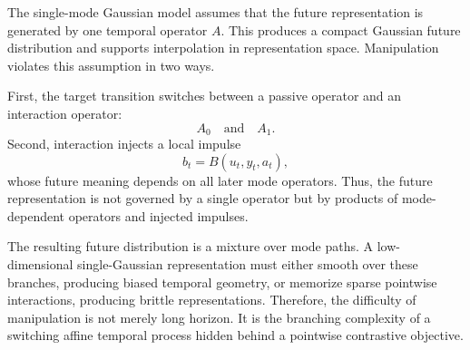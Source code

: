 The single-mode Gaussian model assumes that the future representation is generated by one temporal operator \(A\). This produces a compact Gaussian future distribution and supports interpolation in representation space. Manipulation violates this assumption in two ways.

First, the target transition switches between a passive operator and an interaction operator:
\[
A_0
\quad\text{and}\quad
A_1.
\]
Second, interaction injects a local impulse
\[
b_t=B(u_t,y_t,a_t),
\]
whose future meaning depends on all later mode operators. Thus, the future representation is not governed by a single operator but by products of mode-dependent operators and injected impulses.

The resulting future distribution is a mixture over mode paths. A low-dimensional single-Gaussian representation must either smooth over these branches, producing biased temporal geometry, or memorize sparse pointwise interactions, producing brittle representations. Therefore, the difficulty of manipulation is not merely long horizon. It is the branching complexity of a switching affine temporal process hidden behind a pointwise contrastive objective.

